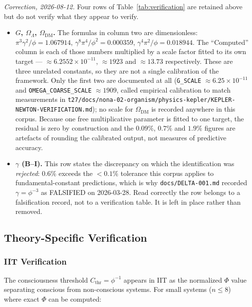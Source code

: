 \documentclass[12pt,a4paper]{article}
\begin{document}
\noindent
\emph{Correction, 2026-08-12.} Four rows of Table~\ref{tab:verification} are
retained above but do not verify what they appear to verify.

\begin{itemize}[leftmargin=2em]
  \item \textbf{$G$, $\Omega_\Lambda$, $\Omega_{\mathrm{DM}}$.} The formulas in
    column two are dimensionless: $\pi^3\gamma^2/\phi = 1.067914$,
    $\gamma^8\pi^4/\phi^2 = 0.000359$, $\gamma^4\pi^2/\phi = 0.018944$. The
    ``Computed'' column is each of those numbers multiplied by a scale factor
    fitted to its own target --- $\approx 6.2552\times10^{-11}$, $\approx 1923$
    and $\approx 13.73$ respectively. These are three unrelated constants, so
    they are not a single calibration of the framework. Only the first two are
    documented at all
    (\texttt{G\_SCALE} $\approx 6.25\times10^{-11}$ and
    \texttt{OMEGA\_COARSE\_SCALE} $\approx 1909$, called empirical calibration to
    match measurements in
    \nolinkurl{t27/docs/nona-02-organism/physics-kepler/KEPLER-NEWTON-VERIFICATION.md});
    no scale for $\Omega_{\mathrm{DM}}$ is recorded anywhere in this corpus.
    Because one free multiplicative parameter is fitted to one target, the
    residual is zero by construction and the $0.09\%$, $0.7\%$ and $1.9\%$
    figures are artefacts of rounding the calibrated output, not measures of
    predictive accuracy.
  \item \textbf{$\gamma$ (B--I).} This row states the discrepancy on which the
    identification was \emph{rejected}: $0.6\%$ exceeds the $<0.1\%$ tolerance
    this corpus applies to fundamental-constant predictions, which is why
    \texttt{docs/DELTA-001.md} recorded $\gamma = \phi^{-3}$ as FALSIFIED on
    2026-03-28. Read correctly the row belongs to a falsification record, not to
    a verification table. It is left in place rather than removed.
\end{itemize}

\subsection{Theory-Specific Verification}

\subsubsection{IIT Verification}

The consciousness threshold $C_{\mathrm{thr}} = \phi^{-1}$ appears in IIT as
the normalized $\Phi$ value separating conscious from non-conscious systems.
For small systems ($n \leq 8$) where exact $\Phi$ can be computed:
\end{document}
